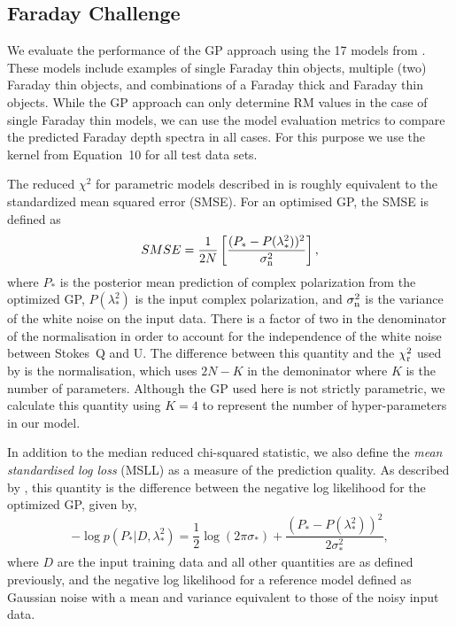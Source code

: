 \documentclass[fleqn,usenatbib]{mnras}
\begin{document}
\subsection{Faraday Challenge}
\label{sec:challenges}

%

%
We evaluate the performance of the GP approach using the 17 models from \cite{Sun_2015}. These models include examples of single Faraday thin objects, multiple (two) Faraday thin objects, and combinations of a Faraday thick and Faraday thin objects. While the GP approach can only determine RM values in the case of single Faraday thin models, we can use the model evaluation metrics to compare the predicted Faraday depth spectra in all cases. For this purpose we use the kernel from Equation~10 for all test data sets.

The reduced $\chi^2$ for parametric models described in \cite{Sun_2015} is roughly equivalent to the standardized mean squared error (SMSE). For an optimised GP, the SMSE is defined as
%
\begin{equation}
SMSE = \frac{1}{2N}\left[ \frac{(P_{\ast} - P(\lambda^2_{\ast}))^2}{\sigma_{\rm n}^2}  \right],
\end{equation}
%
where $P_{\ast}$ is the posterior mean prediction of complex polarization from the optimized GP, $P(\lambda^2_{\ast})$ is the input complex polarization, and $\sigma_{\rm n}^2$ is the variance of the white noise on the input data. There is a factor of two in the denominator of the normalisation in order to account for the independence of the white noise between Stokes~Q and U. The difference between this quantity and the $\chi^2_{\rm r}$ used by \cite{Sun_2015} is the normalisation, which uses $2N-K$ in the demoninator where $K$ is the number of parameters. Although the GP used here is not strictly parametric, we calculate this quantity using $K=4$ to represent the number of hyper-parameters in our model.

In addition to the median reduced chi-squared statistic, we also define the {\it mean standardised log loss} (MSLL) as a measure of the prediction quality. As described by \cite{3569}, this quantity is the difference between the negative log likelihood for the optimized GP, given by,
%
\begin{equation}
-\log p(P_{\ast} | D, \lambda^2_{\ast}) = \frac{1}{2}\log(2\pi \sigma_{\ast}) + \frac{(P_{\ast} - P(\lambda^2_{\ast}))^2}{2\sigma_{\ast}^2},
\end{equation}
%
where $D$ are the input training data and all other quantities are as defined previously, and the negative log likelihood for a reference model defined as Gaussian noise with a mean and variance equivalent to those of the noisy input data.
\end{document}
